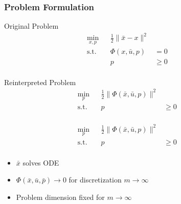 \begin{frame}
    \frametitle{Problem Formulation}

    Original Problem
    \begin{align*}
        \min_{x,p} & & \frac{1}{2} \| \bar{x} - x \|^2 & & \\
        \operatorname{s.t.} & & \Phi(x,\bar{u},p) & = 0 & & \\
                            & & p & \geq 0 & & \\
    \end{align*}

    Reinterpreted Problem
    \begin{align*}
        \min_{p}  & & \frac{1}{2} \| \Phi(\bar{x},\bar{u},p) \|^2 & & \\
        \operatorname{s.t.} & & p & \geq 0 & & \\
    \end{align*}
\end{frame}

\begin{frame}
    \begin{align*}
        \min_{p}  & & \frac{1}{2} \| \Phi(\bar{x},\bar{u},p) \|^2 & & \\
        \operatorname{s.t.} & & p & \geq 0 & & \\
    \end{align*}
    \begin{itemize}
        \item{$\bar{x}$ solves ODE}
        \item{$\Phi(\bar{x},\bar{u},\bar{p}) \rightarrow 0$ for discretization $m \rightarrow \infty$}
        \item{Problem dimension fixed for $m \rightarrow \infty$}
    \end{itemize}
\end{frame}

